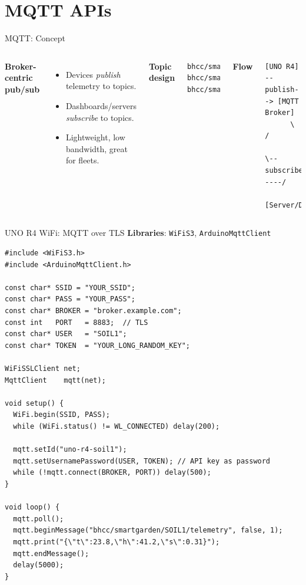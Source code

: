 \documentclass[aspectratio=169]{beamer}
\begin{document}
\section{MQTT APIs}
\begin{frame}[fragile]{MQTT: Concept}
\begin{columns}[T,onlytextwidth]
\textbf{Broker-centric pub/sub}
\begin{itemize}
  \item Devices \textit{publish} telemetry to topics.
  \item Dashboards/servers \textit{subscribe} to topics.
  \item Lightweight, low bandwidth, great for fleets.
\end{itemize}
\medskip
\textbf{Topic design}
\begin{lstlisting}[language={},style=tinyterminal]
bhcc/smartgarden/SOIL1/telemetry
bhcc/smartgarden/SOIL1/status
bhcc/smartgarden/SOIL1/command
\end{lstlisting}

\textbf{Flow}
\begin{lstlisting}[language={},style=tinyterminal]
[UNO R4] --publish--> [MQTT Broker]
      \                   /
       \--subscribe<-----/
           [Server/Dash]
\end{lstlisting}
\end{columns}
\end{frame}

\begin{frame}[fragile]{UNO R4 WiFi: MQTT over TLS}
\textbf{Libraries}: \texttt{WiFiS3}, \texttt{ArduinoMqttClient}
\begin{lstlisting}[language=Arduino,style=tinyterminal]
#include <WiFiS3.h>
#include <ArduinoMqttClient.h>

const char* SSID = "YOUR_SSID";
const char* PASS = "YOUR_PASS";
const char* BROKER = "broker.example.com";
const int   PORT   = 8883;  // TLS
const char* USER   = "SOIL1";
const char* TOKEN  = "YOUR_LONG_RANDOM_KEY";

WiFiSSLClient net;
MqttClient    mqtt(net);

void setup() {
  WiFi.begin(SSID, PASS);
  while (WiFi.status() != WL_CONNECTED) delay(200);

  mqtt.setId("uno-r4-soil1");
  mqtt.setUsernamePassword(USER, TOKEN); // API key as password
  while (!mqtt.connect(BROKER, PORT)) delay(500);
}

void loop() {
  mqtt.poll();
  mqtt.beginMessage("bhcc/smartgarden/SOIL1/telemetry", false, 1);
  mqtt.print("{\"t\":23.8,\"h\":41.2,\"s\":0.31}");
  mqtt.endMessage();
  delay(5000);
}
\end{lstlisting}
\end{frame}
\end{document}
